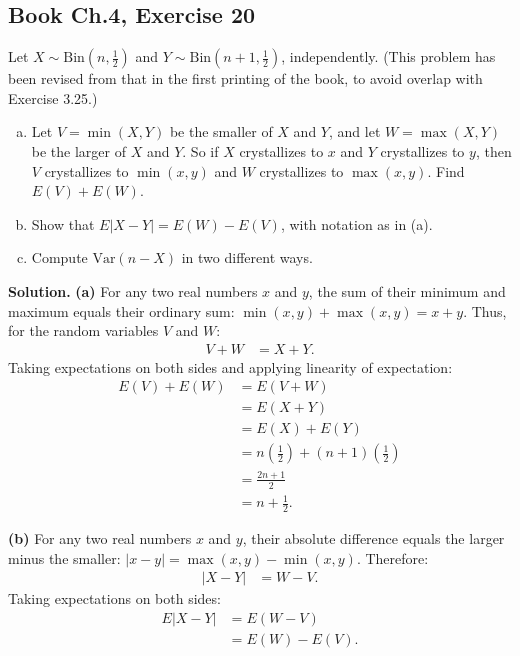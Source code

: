 \documentclass[11pt,a4paper]{article}
\begin{document}
\subsection{Book Ch.4, Exercise 20}
\begin{tcolorbox}[title={Book Ch.4, Exercise 20}]
Let $X \sim \text{Bin}\left(n, \frac{1}{2}\right)$ and $Y \sim \text{Bin}\left(n+1, \frac{1}{2}\right)$, independently. (This problem has been revised from that in the first printing of the book, to avoid overlap with Exercise 3.25.)
\begin{enumerate}[(a)]
\item Let $V = \min(X, Y)$ be the smaller of $X$ and $Y$, and let $W = \max(X, Y)$ be the larger of $X$ and $Y$. So if $X$ crystallizes to $x$ and $Y$ crystallizes to $y$, then $V$ crystallizes to $\min(x, y)$ and $W$ crystallizes to $\max(x, y)$. Find $E(V) + E(W)$.
\item Show that $E|X - Y| = E(W) - E(V)$, with notation as in (a).
\item Compute $\text{Var}(n - X)$ in two different ways.
\end{enumerate}
\end{tcolorbox}

\noindent \textbf{Solution.} \textbf{(a)} For any two real numbers $x$ and $y$, the sum of their minimum and maximum equals their ordinary sum: $\min(x,y) + \max(x,y) = x + y$. Thus, for the random variables $V$ and $W$:
\begin{align*}
V + W &= X + Y.
\end{align*}
Taking expectations on both sides and applying linearity of expectation:
\begin{align*}
E(V) + E(W) &= E(V + W) \\
&= E(X + Y) \\
&= E(X) + E(Y) \\
&= n\left(\frac{1}{2}\right) + (n+1)\left(\frac{1}{2}\right) \\
&= \frac{2n + 1}{2} \\
&= n + \frac{1}{2}.
\end{align*}

\vspace{4pt}
\noindent \textbf{(b)} For any two real numbers $x$ and $y$, their absolute difference equals the larger minus the smaller: $|x - y| = \max(x,y) - \min(x,y)$. Therefore:
\begin{align*}
|X - Y| &= W - V.
\end{align*}
Taking expectations on both sides:
\begin{align*}
E|X - Y| &= E(W - V) \\
&= E(W) - E(V).
\end{align*}
\end{document}
